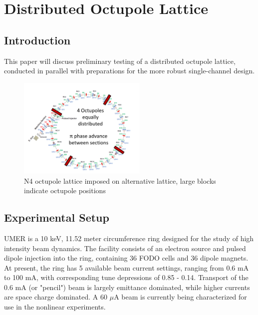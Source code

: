 
\renewcommand{\thechapter}{6}

\chapter{Distributed Octupole Lattice}





\section{Introduction}

This paper will discuss preliminary testing of a distributed octupole lattice, conducted in parallel with preparations for the more robust single-channel design.

\begin{figure}[!htb]
   \centering
   \includegraphics*[width=174pt]{6.figures/N4_lattice}
   \caption{N4 octupole lattice imposed on alternative lattice, large blocks indicate octupole positions}
   \label{N4lattice}
\end{figure}


\section{Experimental Setup}

UMER is a 10 keV, 11.52 meter circumference ring designed for the study of high intensity beam dynamics. The facility consists of an electron source and pulsed dipole injection into the ring, containing 36 FODO cells and 36 dipole magnets. At present, the ring has 5 available beam current settings, ranging from 0.6 mA to 100 mA, with corresponding tune depressions of 0.85 - 0.14.  Transport of the 0.6 mA (or "pencil") beam is largely emittance dominated, while higher currents are space charge dominated.\cite{UMER} A 60 $\mu$A beam is currently being characterized for use in the nonlinear experiments.

